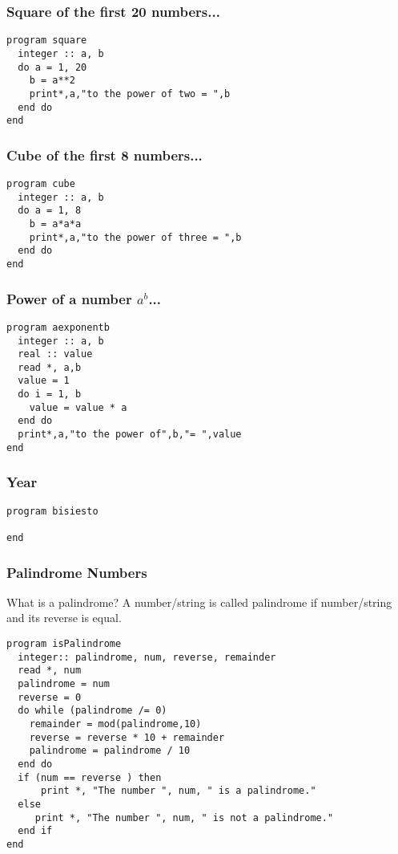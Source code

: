 \documentclass[xcolor=dvipsnames,dvip,notes=show,table]{beamer}
\begin{document}
\begin{frame}[fragile]
\frametitle{Square of the first 20 numbers...}

\scriptsize
\begin{lstlisting}
program square
  integer :: a, b
  do a = 1, 20
    b = a**2
    print*,a,"to the power of two = ",b
  end do
end
\end{lstlisting}
\end{frame}

\begin{frame}[fragile]
\frametitle{Cube of the first 8 numbers...}

\scriptsize
\begin{lstlisting}
program cube
  integer :: a, b
  do a = 1, 8
    b = a*a*a
    print*,a,"to the power of three = ",b
  end do
end
\end{lstlisting}
\end{frame}

\begin{frame}[fragile]
\frametitle{Power of a number $a^b$...}

\scriptsize
\begin{lstlisting}
program aexponentb
  integer :: a, b
  real :: value
  read *, a,b
  value = 1
  do i = 1, b
    value = value * a
  end do
  print*,a,"to the power of",b,"= ",value
end
\end{lstlisting}
\end{frame}

\begin{frame}[fragile]
\frametitle{Year}
\scriptsize
\begin{lstlisting}
program bisiesto
  
end
\end{lstlisting}
\end{frame}


\begin{frame}[fragile]
\frametitle{Palindrome Numbers}
\scriptsize
\begin{block}{What is a palindrome?}
  A number/string is called palindrome if number/string and its reverse is equal.
\end{block}

\begin{lstlisting}
program isPalindrome
  integer:: palindrome, num, reverse, remainder
  read *, num
  palindrome = num
  reverse = 0
  do while (palindrome /= 0)
    remainder = mod(palindrome,10)
    reverse = reverse * 10 + remainder
    palindrome = palindrome / 10	
  end do
  if (num == reverse ) then 
      print *, "The number ", num, " is a palindrome."
  else 
     print *, "The number ", num, " is not a palindrome."
  end if
end 
\end{lstlisting}
\end{frame}
\end{document}
